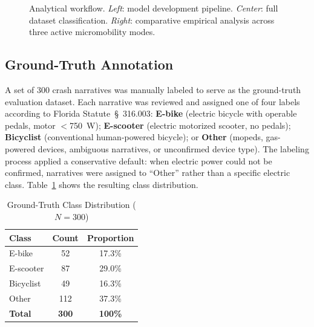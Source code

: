 \documentclass[numbered]{trbunofficial}
\begin{document}
\begin{figure}
\caption{Analytical workflow. \textit{Left}: model development pipeline. \textit{Center}: full dataset classification. \textit{Right}: comparative empirical analysis across three active micromobility modes.}
\label{fig:workflow}
\end{figure}

\subsection{Ground-Truth Annotation}

A set of 300 crash narratives was manually labeled to serve as the ground-truth evaluation dataset. Each narrative was reviewed and assigned one of four labels according to Florida Statute~\S~316.003: \textbf{E-bike} (electric bicycle with operable pedals, motor $<$750~W); \textbf{E-scooter} (electric motorized scooter, no pedals); \textbf{Bicyclist} (conventional human-powered bicycle); or \textbf{Other} (mopeds, gas-powered devices, ambiguous narratives, or unconfirmed device type). The labeling process applied a conservative default: when electric power could not be confirmed, narratives were assigned to ``Other'' rather than a specific electric class. Table~\ref{tab:dist} shows the resulting class distribution.

\begin{table}
\centering
\caption{Ground-Truth Class Distribution ($N = 300$)}
\label{tab:dist}
\begin{tabular}{lcc}
\toprule
\textbf{Class} & \textbf{Count} & \textbf{Proportion} \\
\midrule
E-bike     & 52  & 17.3\% \\
E-scooter  & 87  & 29.0\% \\
Bicyclist  & 49  & 16.3\% \\
Other      & 112 & 37.3\% \\
\midrule
\textbf{Total} & \textbf{300} & \textbf{100\%} \\
\bottomrule
\end{tabular}
\end{table}
\end{document}
